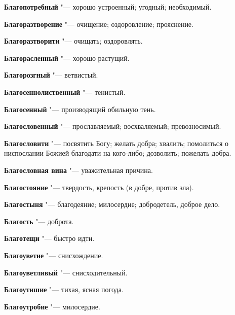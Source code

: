 \begin{mymulticols}{2}
\noindent\textbf{Благопотребный} "--- хорошо устроенный; угодный; необходимый. 




\noindent\textbf{Благоразтворение} "--- очищение; оздоровление; прояснение. 




\noindent\textbf{Благоразтворити} "--- очищать; оздоровлять. 




\noindent\textbf{Благорасленный} "--- хорошо растущий. 




\noindent\textbf{Благорозгный} "--- ветвистый. 




\noindent\textbf{Благосеннолиственный} "--- тенистый. 




\noindent\textbf{Благосенный} "--- производящий обильную тень. 




\noindent\textbf{Благословенный} "--- прославляемый; восхваляемый; превозносимый. 




\noindent\textbf{Благословити} "--- посвятить Богу; желать добра; хвалить; помолиться о ниспослании Божией благодати на кого-либо; дозволить; пожелать добра. 




\noindent\textbf{Благословная вина} "--- уважительная причина. 




\noindent\textbf{Благостояние} "--- твердость, крепость (в добре, против зла). 




\noindent\textbf{Благостыня} "--- благодеяние; милосердие; добродетель, доброе дело. 




\noindent\textbf{Благость} "--- доброта. 




\noindent\textbf{Благотещи} "--- быстро идти. 




\noindent\textbf{Благоуветие} "--- снисхождение. 




\noindent\textbf{Благоуветливый} "--- снисходительный. 




\noindent\textbf{Благоутишие} "--- тихая, ясная погода. 




\noindent\textbf{Благоутробие} "--- милосердие. 





\end{mymulticols}

